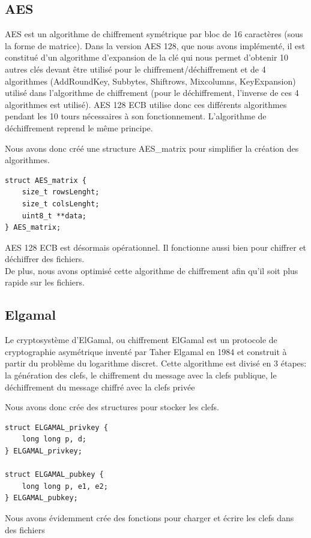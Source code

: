 	\subsection{AES}
        AES est un algorithme de chiffrement symétrique par bloc de 16 caractères (sous la forme de matrice). Dans la version AES 128, que nous avons implémenté, il est constitué d’un algorithme d’expansion de la clé qui nous permet d’obtenir 10 autres clés devant être utilisé pour le chiffrement/déchiffrement et de 4 algorithmes (AddRoundKey, Subbytes, Shiftrows, Mixcolumns, KeyExpansion) utilisé dans l’algorithme de chiffrement (pour le déchiffrement, l’inverse de ces 4 algorithmes est utilisé).
        AES 128 ECB utilise donc ces différents algorithmes pendant les 10 tours nécessaires à son fonctionnement.
        L’algorithme de déchiffrement reprend le même principe.

        Nous avons donc créé une structure AES\_matrix pour simplifier la création des algorithmes.

        \begin{lstlisting}[style=CStyle]
struct AES_matrix {
    size_t rowsLenght;
    size_t colsLenght;
    uint8_t **data;
} AES_matrix;
		\end{lstlisting}	

        AES 128 ECB est désormais opérationnel. Il fonctionne aussi bien pour chiffrer et déchiffrer des fichiers. \\
        De plus, nous avons optimisé cette algorithme de chiffrement afin qu'il soit plus rapide sur les fichiers.
       
     \newpage
      
    \subsection{Elgamal}
        Le cryptosystème d'ElGamal, ou chiffrement ElGamal est un protocole de cryptographie asymétrique inventé par Taher Elgamal en 1984 et construit à partir du problème du logarithme discret. 
        Cette algorithme est divisé en 3 étapes: la génération des clefs, le chiffrement du message avec la clefs publique, le déchiffrement du message chiffré avec la clefs privée
        
        Nous avons donc crée des structures pour stocker les clefs.
        
        \begin{lstlisting}[style=CStyle]
struct ELGAMAL_privkey {
    long long p, d;
} ELGAMAL_privkey;

struct ELGAMAL_pubkey {
    long long p, e1, e2;
} ELGAMAL_pubkey;
		\end{lstlisting}
		Nous avons évidemment crée des fonctions pour charger et écrire les clefs dans des fichiers 
		
